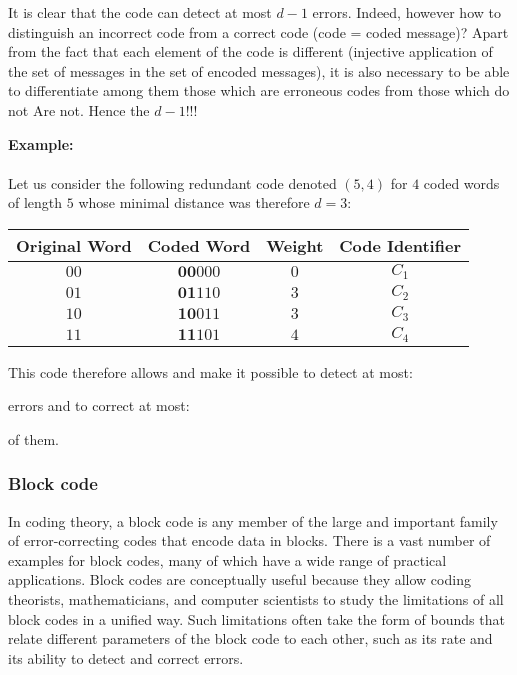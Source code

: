 	It is clear that the code can detect at most $d-1$ errors. Indeed, however how to distinguish an incorrect code from a correct code (code = coded message)? Apart from the fact that each element of the code is different (injective application of the set of messages in the set of encoded messages), it is also necessary to be able to differentiate among them those which are erroneous codes from those which do not Are not. Hence the $d-1$!!!
	\begin{tcolorbox}[colframe=black,colback=white,sharp corners]
	\textbf{{\Large {}}Example:}\\\\
	Let us consider the following redundant code denoted $(5, 4)$ for $4$ coded words of length $5$ whose minimal distance was therefore $d=3$:
	\begin{table}[H]
	\centering
		\begin{tabular}{|c|c|c|c|}
		\hline
		\rowcolor[HTML]{9B9B9B} 
		\textbf{Original Word} & \textbf{Coded Word} & \textbf{Weight} & \textbf{Code Identifier} \\ \hline
		$00$ & $\pmb{00}000$ & $0$ & $C_1$ \\ \hline
		$01$ & $\pmb{01}110$ & $3$ & $C_2$ \\ \hline
		$10$ & $\pmb{10}011$ & $3$ & $C_3$ \\ \hline
		$11$ & $\pmb{11}101$ & $4$ & $C_4$ \\ \hline
		\end{tabular}
	\end{table}
	This code therefore allows and make it possible to detect at most:
	
	errors and to correct at most:
	
	of them.
	\end{tcolorbox}
	
	\subsubsection{Block code}
	In coding theory, a block code is any member of the large and important family of error-correcting codes that encode data in blocks. There is a vast number of examples for block codes, many of which have a wide range of practical applications. Block codes are conceptually useful because they allow coding theorists, mathematicians, and computer scientists to study the limitations of all block codes in a unified way. Such limitations often take the form of bounds that relate different parameters of the block code to each other, such as its rate and its ability to detect and correct errors.

